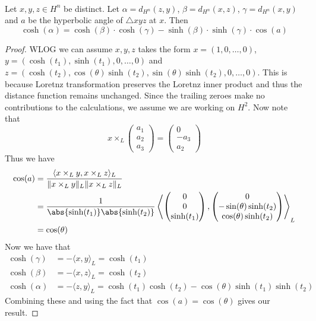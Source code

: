 \documentclass[a4paper]{article}
\begin{document}
\begin{prp}{}{}\\
Let $x,y,z\in H^n$ be distinct. Let $\alpha=d_{H^n}(z,y)$, $\beta=d_{H^n}(x,z)$, $\gamma=d_{H^n}(x,y)$ and $a$ be the hyperbolic angle of $\triangle xyz$ at $x$. Then $$\cosh(\alpha)=\cosh(\beta)\cdot\cosh(\gamma)-\sinh(\beta)\cdot\sinh(\gamma)\cdot\cos(a)$$ 
\begin{proof}
WLOG we can assume $x,y,z$ takes the form $x=(1,0,\dots,0)$, $y=(\cosh(t_1),\sinh(t_1),0,\dots,0)$ and $z=(\cosh(t_2),\cos(\theta)\sinh(t_2),\sin(\theta)\sinh(t_2),0,\dots,0)$. This is because Loretnz transformation preserves the Loretnz inner product and thus the distance function remains unchanged. Since the trailing zeroes make no contributions to the calculations, we assume we are working on $H^2$. Now note that $$x\times_L\begin{pmatrix}a_1\\a_2\\a_3\end{pmatrix}=\begin{pmatrix}0\\-a_3\\a_2\end{pmatrix}$$ Thus we have 
\begin{align*}
\cos(a)&=\frac{\langle x\times_Ly,x\times_Lz\rangle_L}{\|x\times_Ly\|_L\|x\times_Lz\|_L}\\
&=\frac{1}{\abs{\sinh(t_1)}\abs{\sinh(t_2)}}\left\langle\begin{pmatrix}0\\0\\\sinh(t_1)\end{pmatrix},\begin{pmatrix}0\\-\sin(\theta)\sinh(t_2)\\\cos(\theta)\sinh(t_2)\end{pmatrix}\right\rangle_L\\
&=\cos(\theta)
\end{align*}
Now we have that 
\begin{align*}
\cosh(\gamma)&=-\langle x,y\rangle_L=\cosh(t_1)\\
\cosh(\beta)&=-\langle x,z\rangle_L=\cosh(t_2)\\
\cosh(\alpha)&=-\langle z,y\rangle_L=\cosh(t_1)\cosh(t_2)-\cos(\theta)\sinh(t_1)\sinh(t_2)
\end{align*}
Combining these and using the fact that $\cos(a)=\cos(\theta)$ gives our result. 
\end{proof}
\end{prp}
\end{document}
